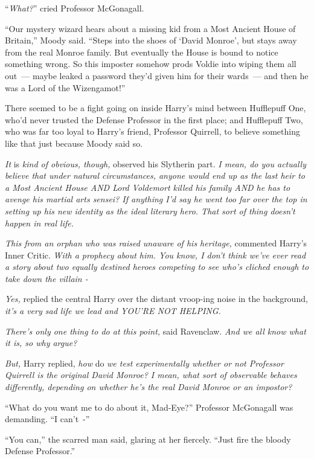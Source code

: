 ``\emph{What?}'' cried Professor McGonagall.

``Our mystery wizard hears about a missing kid from a Most Ancient House of Britain,'' Moody said. ``Steps into the shoes of `David Monroe', but stays away from the real Monroe family. But eventually the House is bound to notice something wrong. So this imposter somehow prods Voldie into wiping them all out~--- maybe leaked a password they'd given him for their wards~--- and then he was a Lord of the Wizengamot!''

There seemed to be a fight going on inside Harry's mind between Hufflepuff One, who'd never trusted the Defense Professor in the first place; and Hufflepuff Two, who was far too loyal to Harry's friend, Professor Quirrell, to believe something like that just because Moody said so.

\emph{It} is \emph{kind of obvious, though,} observed his Slytherin part. \emph{I mean, do you actually believe that under natural circumstances, anyone would end up as the last heir to a Most Ancient House AND Lord Voldemort killed his family AND he has to avenge his martial arts sensei? If anything I'd say he went too far over the top in setting up his new identity as the ideal literary hero. That sort of thing doesn't happen in real life.}

\emph{This from an orphan who was raised unaware of his heritage,} commented Harry's Inner Critic. \emph{With a prophecy about him. You know, I don't think we've ever read a story about two equally destined heroes competing to see who's cliched enough to take down the villain -}

\emph{Yes,} replied the central Harry over the distant vroop-ing noise in the background, \emph{it's a very sad life we lead and YOU'RE NOT HELPING.}

\emph{There's only one thing to do at this point,} said Ravenclaw. \emph{And we all know what it is, so why argue?}

\emph{But,} Harry replied, \emph{how} do \emph{we test experimentally whether or not Professor Quirrell is the original David Monroe? I mean, what sort of observable behaves differently, depending on whether he's the real David Monroe or an impostor?}

``What do you want me to do about it, Mad-Eye?'' Professor McGonagall was demanding. ``I can't~-''

``You can,'' the scarred man said, glaring at her fiercely. ``Just fire the bloody Defense Professor.''

